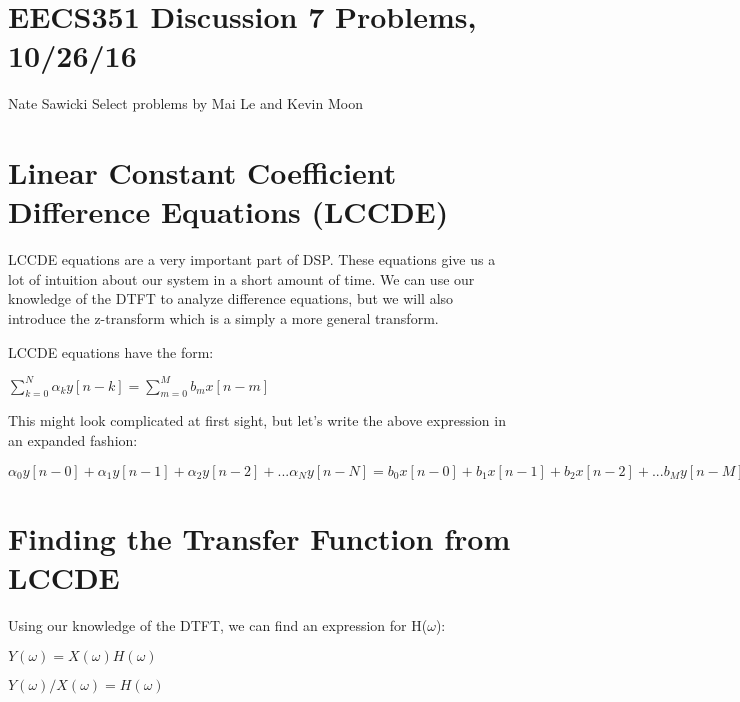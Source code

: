 \documentclass[11pt]{article}
\begin{document}
\section*{EECS351 Discussion 7 Problems, 10/26/16}
Nate Sawicki \newline
Select problems by Mai Le and Kevin Moon

\section{Linear Constant Coefficient Difference Equations (LCCDE)}
 
LCCDE equations are a very important part of DSP. These equations give us a lot of intuition about our system in a short amount of time. We can use our knowledge of the DTFT to analyze difference equations, but we will also introduce the z-transform which is a simply a more general transform. \newline

LCCDE equations have the form:
\vspace{3mm}
\begin{center}

$
\sum_{k  = 0}^{N} \alpha_k y[n - k] =  \sum_{m  = 0}^{M} b_m x[n - m] 
$
\end{center}

This might look complicated at first sight, but let's write the above expression in an expanded fashion:
\vspace{3mm}

\begin{center}
$
\alpha_0 y[n - 0] + \alpha_1 y[n - 1] + \alpha_2 y[n - 2] + ... \alpha_N y[n - N] =  b_0 x[n - 0] + b_1 x[n - 1] + b_2 x[n - 2] + ... b_M y[n - M] 
$
\end{center}

\section{Finding the Transfer Function from LCCDE}
 
Using our knowledge of the DTFT, we can find an expression for H($\omega$):
\vspace{2mm}

\begin{center}

$
Y(\omega) = X(\omega)H(\omega)
$
\end{center}
\begin{center}

$
Y(\omega)/X(\omega) = H(\omega)
$
\end{center}
\end{document}
